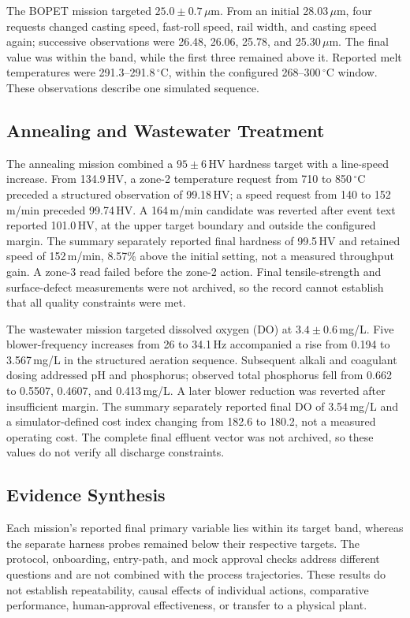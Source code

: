The BOPET mission targeted $25.0\pm0.7$\,$\mu$m. From an initial
28.03\,$\mu$m, four requests changed casting speed, fast-roll speed, rail
width, and casting speed again; successive observations were 26.48, 26.06,
25.78, and 25.30\,$\mu$m. The final value was within the band, while the
first three remained above it. Reported melt temperatures were
291.3--291.8\,$^{\circ}$C, within the configured 268--300\,$^{\circ}$C
window. These observations describe one simulated sequence.

\subsection{Annealing and Wastewater Treatment}
The annealing mission combined a $95\pm6$\,HV hardness target with a
line-speed increase. From 134.9\,HV, a zone-2 temperature request from 710 to
850\,$^{\circ}$C preceded a structured observation of 99.18\,HV; a speed
request from 140 to 152\,m/min preceded 99.74\,HV. A 164\,m/min candidate
was reverted after event text reported 101.0\,HV, at the upper target boundary
and outside the configured margin. The summary separately reported final
hardness of 99.5\,HV and retained speed of 152\,m/min, 8.57\% above the initial
setting, not a measured throughput gain. A zone-3 read failed before the
zone-2 action. Final tensile-strength and surface-defect measurements were
not archived, so the record cannot establish that all quality constraints
were met.

The wastewater mission targeted dissolved oxygen (DO) at $3.4\pm0.6$\,mg/L.
Five blower-frequency increases from 26 to 34.1\,Hz accompanied a rise from
0.194 to 3.567\,mg/L in the structured aeration sequence. Subsequent alkali
and coagulant dosing addressed pH and phosphorus; observed total phosphorus
fell from 0.662 to 0.5507, 0.4607, and 0.413\,mg/L. A later blower reduction
was reverted after insufficient margin. The summary separately reported final
DO of 3.54\,mg/L and a simulator-defined cost index changing from 182.6 to
180.2, not a measured operating cost. The complete final effluent vector was
not archived, so these values do not verify all discharge constraints.

\subsection{Evidence Synthesis}
Each mission's reported final primary variable lies within its target band,
whereas the separate harness probes remained below their respective targets.
The protocol, onboarding, entry-path, and mock approval checks address
different questions and are not combined with the process trajectories. These
results do not establish repeatability, causal effects of individual actions,
comparative performance, human-approval effectiveness, or transfer to a
physical plant.
